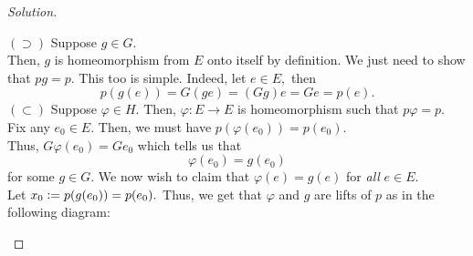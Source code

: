 \documentclass[12pt]{article}
\theoremstyle{definition}
\numberwithin{thm}{section}
\newenvironment{soln}{\begin{proof}[Solution]}{\end{proof}}
\begin{document}
\begin{soln}
\begin{enumerate}
		$(\supset)$ Suppose $g \in G.$\\
		Then, $g$ is homeomorphism from $E$ onto itself by definition. We just need to show that $pg = p.$ This too is simple. Indeed, let $e \in E,$ then
		\begin{equation*} 
			p(g(e)) = G(ge) = (Gg)e = Ge = p(e).
		\end{equation*}
		$(\subset)$ Suppose $\varphi \in H.$ Then, $\varphi:E \to E$ is homeomorphism such that $p\varphi = p.$\\
		Fix any $e_0 \in E.$ Then, we must have $p(\varphi(e_0)) = p(e_0).$\\
		Thus, $G\varphi(e_0) = Ge_0$ which tells us that
		\begin{equation*} 
			\varphi(e_0) = g(e_0)
		\end{equation*}
		for some $g \in G.$ We now wish to claim that $\varphi(e) = g(e)$ for \emph{all} $e \in E.$\\
		Let $x_0 \vcentcolon= p(g(e_0)) = p(e_0).$ Thus, we get that $\varphi$ and $g$ are lifts of $p$ as in the following diagram:
		
		\begin{center}
		\end{center}


\end{enumerate}
\end{soln}
\end{document}
